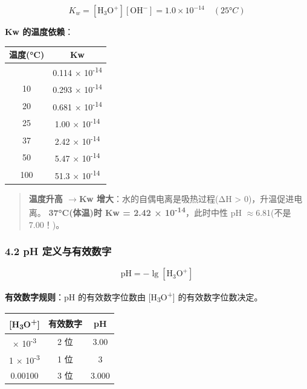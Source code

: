 \documentclass[a4paper,11pt]{ctexart}
\newcounter{none}
\newcommand{\箭}{\ensuremath{\rightarrow}}
\newcommand{\左箭}{\ensuremath{\leftarrow}}
\newcommand{\上箭}{\ensuremath{\uparrow}}
\newcommand{\下箭}{\ensuremath{\downarrow}}
\newcommand{\衡}{\ensuremath{\rightleftharpoons}}
\newcommand{\双箭}{\ensuremath{\leftrightarrow}}
\newcommand{\约等于}{\ensuremath{\approx}}
\newcommand{\小于等于}{\ensuremath{\leq}}
\newcommand{\大于等于}{\ensuremath{\geq}}
\newcommand{\不等于}{\ensuremath{\neq}}
\newcommand{\西格马}{\ensuremath{\sigma}}
\newcommand{\派}{\ensuremath{\pi}}
\begin{document}
\[
\boxed{K_w = [\mathrm{H_3O^+}][\mathrm{OH^-}] = 1.0 \times 10^{-14} \quad (25°C)}
\]

\textbf{Kw 的温度依赖}：

{\def\LTcaptype{none} %
\begin{longtable}[]{@{}cc@{}}
\toprule\noalign{}
温度(°C) & Kw \\
\midrule\noalign{}
\endhead
\bottomrule\noalign{}
\endlastfoot
0 & 0.114 × 10\textsuperscript{-14} \\
10 & 0.293 × 10\textsuperscript{-14} \\
20 & 0.681 × 10\textsuperscript{-14} \\
25 & 1.00 × 10\textsuperscript{-14} \\
37 & 2.42 × 10\textsuperscript{-14} \\
50 & 5.47 × 10\textsuperscript{-14} \\
100 & 51.3 × 10\textsuperscript{-14} \\
\end{longtable}
}

\begin{quote}
\textbf{温度升高 \箭 Kw 增大}：水的自偶电离是吸热过程(ΔH \textgreater{} 0)，升温促进电离。
\textbf{37°C(体温)时 Kw = 2.42 × 10\textsuperscript{-14}}，此时中性 pH \约等于 6.81(不是 7.00！)。
\end{quote}

\subsubsection{4.2 pH 定义与有效数字}\label{ph-ux5b9aux4e49ux4e0eux6709ux6548ux6570ux5b57}

\[
\mathrm{pH} = -\lg[\mathrm{H_3O^+}]
\]

\textbf{有效数字规则}：pH 的有效数字位数由 {[}H\textsubscript{3}O\textsuperscript{+}{]} 的有效数字位数决定。

{\def\LTcaptype{none} %
\begin{longtable}[]{@{}ccc@{}}
\toprule\noalign{}
{[}H\textsubscript{3}O\textsuperscript{+}{]} & 有效数字 & pH \\
\midrule\noalign{}
\endhead
\bottomrule\noalign{}
\endlastfoot
1.0 × 10\textsuperscript{-3} & 2 位 & 3.00 \\
1 × 10\textsuperscript{-3} & 1 位 & 3 \\
0.00100 & 3 位 & 3.000 \\
\end{longtable}
}
\end{document}
